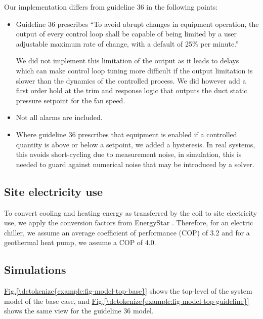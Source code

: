 \documentclass[letterpaper,10pt, openany,english]{sphinxmanual}
\begin{document}
Our implementation differs from guideline 36 in the following points:
\begin{itemize}
\item {} 
Guideline 36 prescribes “To avoid abrupt changes in equipment operation,
the output of every control loop shall be capable of being limited
by a user adjustable maximum rate of change, with
a default of 25\% per minute.”

We did not implement this limitation of the output as it leads to delays
which can make control loop tuning more difficult if the output limitation
is slower than the dynamics of the controlled process.
We did however add a first order hold at the trim and response logic
that outputs the duct static pressure setpoint for the fan speed.

\item {} 
Not all alarms are included.

\item {} 
Where guideline 36 prescribes that equipment is enabled if a controlled quantity
is above or below a setpoint, we added a hysteresis. In real systems, this
avoids short-cycling due to measurement noise, in simulation, this is needed
to guard against numerical noise that may be introduced by a solver.

\end{itemize}


\subsection{Site electricity use}
\label{\detokenize{example:site-electricity-use}}
To convert cooling and heating energy as transferred by the coil to site electricity
use, we apply the conversion factors from EnergyStar .
Therefore, for an electric chiller, we assume an average coefficient of performance (COP) of
\(3.2\) and for a geothermal heat pump, we assume a COP of \(4.0\).


\subsection{Simulations}
\label{\detokenize{example:simulations}}
\hyperref[\detokenize{example:fig-model-top-base}]{Fig.\@ \ref{\detokenize{example:fig-model-top-base}}} shows the top-level of the system model of the base case, and
\hyperref[\detokenize{example:fig-model-top-guideline}]{Fig.\@ \ref{\detokenize{example:fig-model-top-guideline}}} shows the same view for the guideline 36 model.
\end{document}
